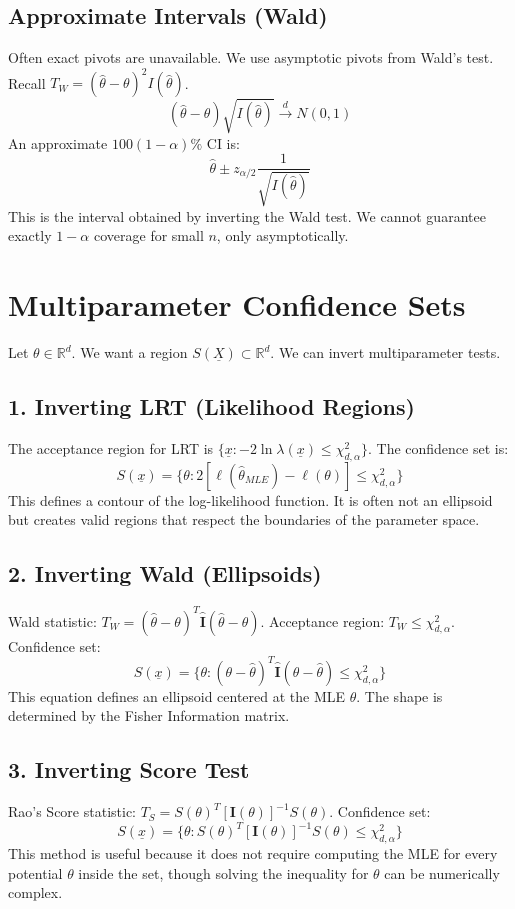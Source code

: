 \documentclass[12pt, a4paper]{article}
\theoremstyle{definition}
\newcommand{\R}{\mathbb{R}}
\newcommand{\xvec}{\underline{x}}
\newcommand{\Xvec}{\underline{X}}
\begin{document}
\subsection{Approximate Intervals (Wald)}
Often exact pivots are unavailable. We use asymptotic pivots from Wald's test.
Recall $T_W = (\hat{\theta} - \theta)^2 I(\hat{\theta})$.
$$ (\hat{\theta} - \theta) \sqrt{I(\hat{\theta})} \xrightarrow{d} N(0, 1) $$
An approximate $100(1-\alpha)\%$ CI is:
$$ \hat{\theta} \pm z_{\alpha/2} \frac{1}{\sqrt{I(\hat{\theta})}} $$
This is the interval obtained by inverting the Wald test.
We cannot guarantee exactly $1-\alpha$ coverage for small $n$, only asymptotically.

\section{Multiparameter Confidence Sets}

Let $\theta \in \R^d$. We want a region $S(\Xvec) \subset \R^d$.
We can invert multiparameter tests.

\subsection{1. Inverting LRT (Likelihood Regions)}
The acceptance region for LRT is $\{ \xvec : -2 \ln \lambda(\xvec) \le \chi^2_{d, \alpha} \}$.
The confidence set is:
$$ S(\xvec) = \{ \theta : 2[\ell(\hat{\theta}_{MLE}) - \ell(\theta)] \le \chi^2_{d, \alpha} \} $$
This defines a contour of the log-likelihood function. It is often not an ellipsoid but creates valid regions that respect the boundaries of the parameter space.

\subsection{2. Inverting Wald (Ellipsoids)}
Wald statistic: $T_W = (\hat{\theta} - \theta)^T \widehat{\mathbf{I}} (\hat{\theta} - \theta)$.
Acceptance region: $T_W \le \chi^2_{d, \alpha}$.
Confidence set:
$$ S(\xvec) = \{ \theta : (\theta - \hat{\theta})^T \widehat{\mathbf{I}} (\theta - \hat{\theta}) \le \chi^2_{d, \alpha} \} $$
This equation defines an ellipsoid centered at the MLE $\hat{\theta}$. The shape is determined by the Fisher Information matrix.

\subsection{3. Inverting Score Test}
Rao's Score statistic: $T_S = S(\theta)^T [\mathbf{I}(\theta)]^{-1} S(\theta)$.
Confidence set:
$$ S(\xvec) = \{ \theta : S(\theta)^T [\mathbf{I}(\theta)]^{-1} S(\theta) \le \chi^2_{d, \alpha} \} $$
This method is useful because it does not require computing the MLE for every potential $\theta$ inside the set, though solving the inequality for $\theta$ can be numerically complex.
\end{document}
